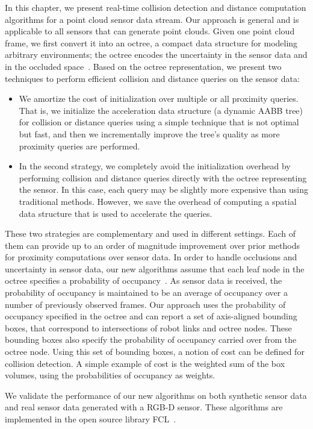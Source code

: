 In this chapter, we present real-time collision detection and distance
computation algorithms for a point cloud sensor data stream.  Our approach is
general and is applicable to all sensors that can generate point clouds.
Given one point cloud frame, we first convert it into an octree, a
compact data structure for modeling arbitrary environments; the octree encodes
the uncertainty in the sensor data and in the occluded
space~\cite{octomap}. Based on the octree representation, we present
two techniques to perform efficient collision and distance queries on
the sensor data:
\begin{itemize}
\item We amortize the cost of initialization over multiple or all
  proximity queries. That is, we initialize the acceleration data structure (a dynamic AABB tree) for
  collision or distance queries using a simple technique
  that is not optimal but fast, and then we incrementally improve the tree's quality as more proximity queries are performed.
\item In the second strategy, we completely avoid the initialization
  overhead by performing collision and distance queries directly with
  the octree representing the sensor. In this case, each query
  may be slightly more expensive than using traditional methods. However, we save the overhead of computing a spatial data structure that is used to accelerate the queries.
\end{itemize}

These two strategies are complementary and used in different settings. Each of them can provide up to an order of magnitude improvement over prior methods for proximity computations over sensor data. In order to handle occlusions and uncertainty in sensor data, our new algorithms assume that each leaf
node in the octree specifies a probability of
occupancy~\cite{octomap}. As sensor data is received, the probability of
occupancy is maintained to be an average of occupancy over a number of
previously observed frames. Our
approach uses the probability of occupancy specified in the octree and
can report a set of axis-aligned bounding boxes, that
correspond to intersections of robot links and octree nodes. These
bounding boxes also specify the probability of occupancy carried over
from the octree node. Using this set of bounding boxes, a notion of
cost can be defined for collision detection. A simple example of cost is the
weighted sum of the box volumes, using the probabilities of occupancy
as weights.

We validate the performance of our new algorithms on both synthetic
sensor data and real sensor data generated with a RGB-D sensor.
These algorithms are implemented in the open source library
FCL~\cite{Pan:ICRA:2012}.

